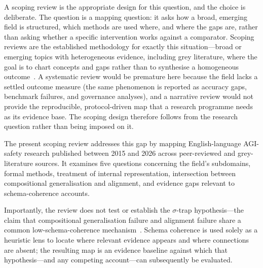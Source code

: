 A scoping review is the appropriate design for this question, and the choice is deliberate. The question is a mapping question: it asks how a broad, emerging field is structured, which methods are used where, and where the gaps are, rather than asking whether a specific intervention works against a comparator. Scoping reviews are the established methodology for exactly this situation---broad or emerging topics with heterogeneous evidence, including grey literature, where the goal is to chart concepts and gaps rather than to synthesise a homogeneous outcome~\cite{arksey2005scoping,levac2010scoping,tricco2018prismascr}. A systematic review would be premature here because the field lacks a settled outcome measure (the same phenomenon is reported as accuracy gaps, benchmark failures, and governance analyses), and a narrative review would not provide the reproducible, protocol-driven map that a research programme needs as its evidence base. The scoping design therefore follows from the research question rather than being imposed on it.

The present scoping review addresses this gap by mapping English-language AGI-safety research published between 2015 and 2026 across peer-reviewed and grey-literature sources. It examines five questions concerning the field's subdomains, formal methods, treatment of internal representation, intersection between compositional generalisation and alignment, and evidence gaps relevant to schema-coherence accounts.

Importantly, the review does not test or establish the $\sigma$-trap hypothesis---the claim that compositional generalisation failure and alignment failure share a common low-schema-coherence mechanism~\cite{amsyar2026sigma}. Schema coherence is used solely as a heuristic lens to locate where relevant evidence appears and where connections are absent; the resulting map is an evidence baseline against which that hypothesis---and any competing account---can subsequently be evaluated.

